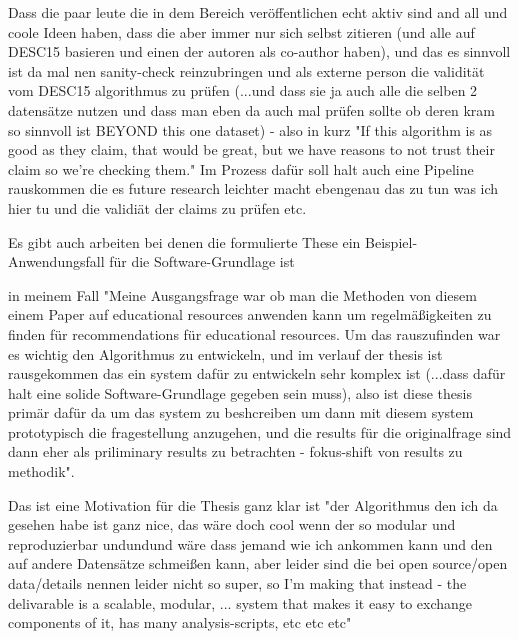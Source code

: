 
Dass die paar leute die in dem Bereich veröffentlichen echt aktiv sind and all und coole Ideen haben, dass die aber immer nur sich selbst zitieren (und alle auf DESC15 basieren und einen der autoren als co-author haben), und das es sinnvoll ist da mal nen sanity-check reinzubringen und als externe person die validität vom DESC15 algorithmus zu prüfen (...und dass sie ja auch alle die selben 2 datensätze nutzen und dass man eben da auch mal prüfen sollte ob deren kram so sinnvoll ist BEYOND this one dataset) - also in kurz "If this algorithm is as good as they claim, that would be great, but we have reasons to not trust their claim so we're checking them." Im Prozess dafür soll halt auch eine Pipeline rauskommen die es future research leichter macht ebengenau das zu tun was ich hier tu und die validiät der claims zu prüfen etc.

Es gibt auch arbeiten bei denen die formulierte These ein Beispiel-Anwendungsfall für die Software-Grundlage ist

in meinem Fall "Meine Ausgangsfrage war ob man die Methoden von diesem einem Paper auf educational resources anwenden kann um regelmäßigkeiten zu finden für recommendations für educational resources. Um das rauszufinden war es wichtig den Algorithmus zu entwickeln, und im verlauf der thesis ist rausgekommen das ein system dafür zu entwickeln sehr komplex ist (...dass dafür halt eine solide Software-Grundlage gegeben sein muss), also ist diese thesis primär dafür da um das system zu beshcreiben um dann mit diesem system prototypisch die fragestellung anzugehen, und die results für die originalfrage sind dann eher als priliminary results zu betrachten - fokus-shift von results zu methodik".

Das ist eine Motivation für die Thesis ganz klar ist "der Algorithmus den ich da gesehen habe ist ganz nice, das wäre doch cool wenn der so modular und reproduzierbar undundund wäre dass jemand wie ich ankommen kann und den auf andere Datensätze schmeißen kann, aber leider sind die bei open source/open data/details nennen leider nicht so super, so I'm making that instead - the delivarable is a scalable, modular, ... system that makes it easy to exchange components of it, has many analysis-scripts, etc etc etc" 

